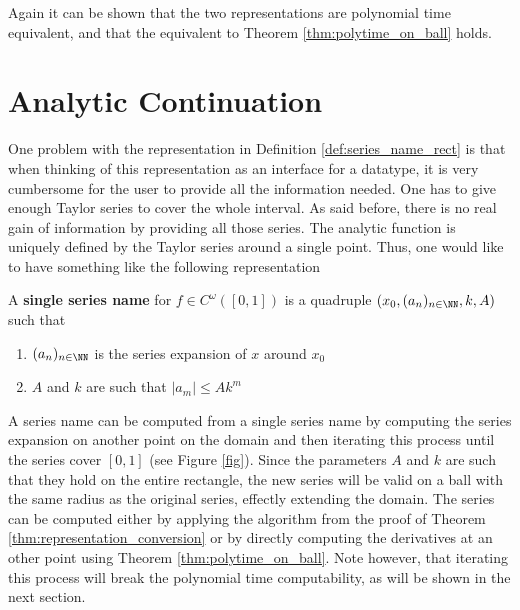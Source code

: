 	Again it can be shown that the two representations are polynomial time equivalent, and that the equivalent to
	Theorem \ref{thm:polytime_on_ball} holds.
	\section{Analytic Continuation}
		One problem with the representation in Definition \ref{def:series_name_rect} is that when thinking of this representation as an interface for a datatype, it is very cumbersome for the user to provide all the information needed. 
		One has to give enough Taylor series to cover the whole interval.
		As said before, there is no real gain of information by providing all those series.
		The analytic function is uniquely defined by the Taylor series around a single point.
		Thus, one would like to have something like the following representation
		\begin{definition}
			A \textbf{single series name} for $f \in C^\omega([0,1])$ is a quadruple $(x_0, (a_n)_{n \in \NN}, k, A)$ such that
			\begin{enumerate}
				\item $(a_n)_{n \in \NN}$ is the series expansion of $x$ around $x_0$
				\item $A$ and $k$ are such that $| a_m | \leq Ak^m$ 
			\end{enumerate}
		\end{definition}
		A series name can be computed from a single series name by computing the series expansion on another point on the domain and then iterating this process until the series cover $[0,1]$ (see Figure \ref{fig}).
		Since the parameters $A$ and $k$ are such that they hold on the entire rectangle, 
		the new series will be valid on a ball with the same radius as the original series, effectly extending the domain.
		The series can be computed either by applying the algorithm from the proof of Theorem \ref{thm:representation_conversion} or by directly computing the derivatives at an other point using Theorem \ref{thm:polytime_on_ball}.
		Note however, that iterating this process will break the polynomial time computability, as will be shown in the next
		section.
